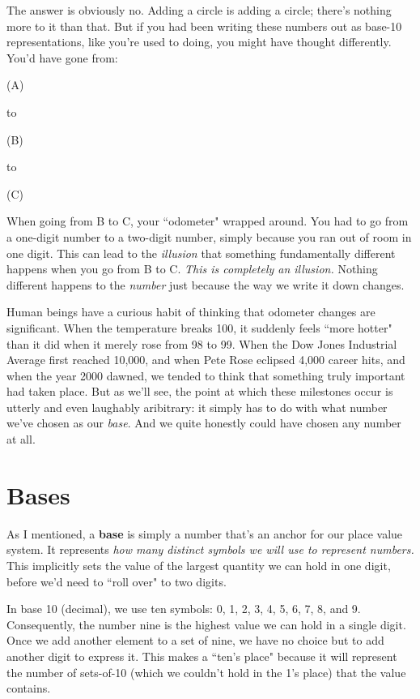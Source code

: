 The answer is obviously no. Adding a circle is adding a circle; there's
nothing more to it than that. But if you had been writing these numbers out
as base-10 representations, like you're used to doing, you might have
thought differently. You'd have gone from:
\begin{center}
{\large (A)} \quad\quad \raisebox{-.6mm}{\LARGE 8}
\end{center}
to
\begin{center}
{\large (B)} \quad\quad \raisebox{-.6mm}{\LARGE 9}
\end{center}
to
\begin{center}
{\large (C)} \quad\quad \raisebox{-.6mm}{\LARGE 10}
\end{center}
When going from B to C, your ``odometer" wrapped around. You had to go from
a one-digit number to a two-digit number, simply because you ran out of
room in one digit. This can lead to the \textit{illusion} that something
fundamentally different happens when you go from B to C. \textit{This is
completely an illusion.} Nothing different happens to the \textit{number}
just because the way we write it down changes.

Human beings have a curious habit of thinking that odometer changes are
significant. When the temperature breaks 100, it suddenly feels ``more
hotter" than it did when it merely rose from 98 to 99. When the Dow Jones
Industrial Average first reached 10,000, and when Pete Rose eclipsed 4,000
career hits, and when the year 2000 dawned, we tended to think that
something truly important had taken place. But as we'll see, the point at
which these milestones occur is utterly and even laughably aribitrary: it
simply has to do with what number we've chosen as our \textit{base}. And we
quite honestly could have chosen any number at all.

\section{Bases}

As I mentioned, a \textbf{base} is simply a number that's an anchor for our
place value system. It represents \textit{how many distinct symbols we
will use to represent numbers.} This implicitly sets the value of the
largest quantity we can hold in one digit, before we'd need to ``roll over"
to two digits.

In base 10 (decimal), we use ten symbols: 0, 1, 2, 3, 4, 5, 6, 7, 8, and 9.
Consequently, the number nine is the highest value we can hold in a single
digit. Once we add another element to a set of nine, we have no choice but
to add another digit to express it. This makes a ``ten's place" because it
will represent the number of sets-of-10 (which we couldn't hold in the 1's
place) that the value contains.

